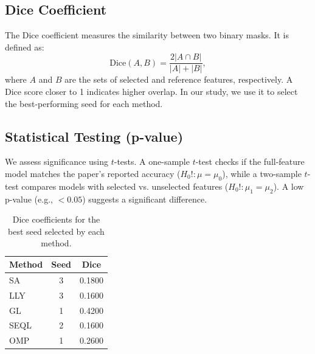 \documentclass[a4paper,twocolumn]{article} %
\begin{document}
\subsection{Dice Coefficient}
The Dice coefficient measures the similarity between two binary masks. It is defined as:
\begin{equation}
    \mathrm{Dice}(A, B) = \frac{2|A \cap B|}{|A| + |B|},
\end{equation}
where $A$ and $B$ are the sets of selected and reference features, respectively. A Dice score closer to 1 indicates higher overlap. In our study, we use it to select the best-performing seed for each method.
\subsection{Statistical Testing (p-value)}
We assess significance using $t$-tests. A one-sample $t$-test checks if the full-feature model matches the paper's reported accuracy ($H_0!: \mu = \mu_0$), while a two-sample $t$-test compares models with selected vs. unselected features ($H_0!: \mu_1 = \mu_2$). A low p-value (e.g., $< 0.05$) suggests a significant difference.
\begin{table}[ht]
    \centering
    \caption{Dice coefficients for the best seed selected by each method.}
    \begin{tabular}{lcc}
        \hline
        \textbf{Method} & \textbf{Seed} & \textbf{Dice} \\
        \hline
        SA    & 3 & 0.1800 \\
        LLY   & 3 & 0.1600 \\
        GL    & 1 & 0.4200 \\
        SEQL  & 2 & 0.1600 \\
        OMP   & 1 & 0.2600 \\
        \hline
    \end{tabular}
    \label{tab:dice_results}
\end{table}
\end{document}
